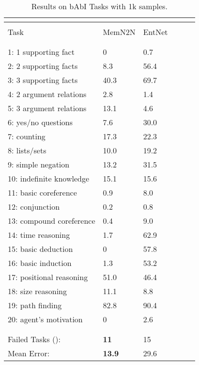 \documentclass{article} \usepackage{iclr2016_conference,times}
\newcommand{\modelabbrev}{EntNet}
\begin{document}
\begin{table}[t]
\caption{Results on bAbI Tasks with 1k samples.}
\label{1k-samples}
\begin{center}
\begin{tabular}{llllll}
\multicolumn{1}{c}{\bf }  &\multicolumn{2}{c}{}\\ \hline \\
Task & MemN2N & \modelabbrev \\
\\ \hline \\
1: 1 supporting fact & 0 & 0.7        \\
2: 2 supporting facts & 8.3 & 56.4       \\
3: 3 supporting facts & 40.3 & 69.7       \\
4: 2 argument relations & 2.8 & 1.4      \\
5: 3 argument relations & 13.1 & 4.6      \\
6: yes/no questions & 7.6 & 30.0         \\
7: counting & 17.3 & 22.3 \\
8: lists/sets & 10.0 & 19.2 \\
9: simple negation & 13.2 & 31.5 \\
10: indefinite knowledge & 15.1 & 15.6 \\
11: basic coreference & 0.9 & 8.0 \\
12: conjunction & 0.2 & 0.8\\
13: compound coreference & 0.4 & 9.0 \\
14: time reasoning & 1.7 & 62.9\\
15: basic deduction & 0 & 57.8\\
16: basic induction & 1.3 & 53.2 \\
17: positional reasoning & 51.0 & 46.4 \\
18: size reasoning & 11.1 & 8.8\\
19: path finding  & 82.8 & 90.4 \\
20: agent's motivation & 0 & 2.6\\
\\ \hline \\
Failed Tasks (): & \textbf{11} & 15\\
Mean Error: & \textbf{13.9} & 29.6\\
\end{tabular}
\end{center}
\end{table}
\end{document}
